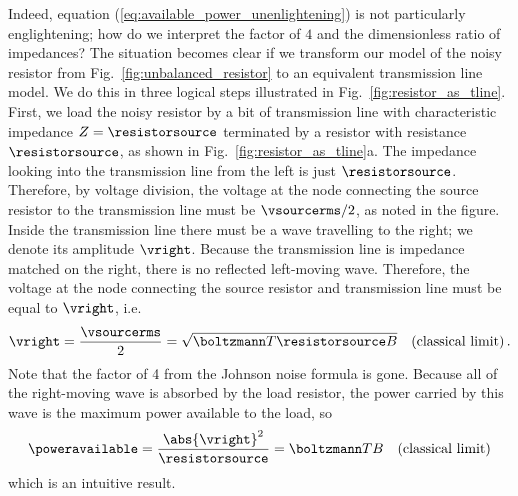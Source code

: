 Indeed, equation (\ref{eq:available_power_unenlightening}) is not particularly englightening; how do we interpret the factor of $4$ and the dimensionless ratio of impedances?
The situation becomes clear if we transform our model of the noisy resistor from Fig.~\ref{fig:unbalanced_resistor} to an equivalent transmission line model.
We do this in three logical steps illustrated in Fig.~\ref{fig:resistor_as_tline}.
First, we load the noisy resistor by a bit of transmission line with characteristic impedance $Z=\resistorsource$ terminated by a resistor with resistance $\resistorsource$, as shown in Fig.~\ref{fig:resistor_as_tline}a.
The impedance looking into the transmission line from the left is just $\resistorsource$.
Therefore, by voltage division, the voltage at the node connecting the source resistor to the transmission line must be $\vsourcerms/2$, as noted in the figure.
Inside the transmission line there must be a wave travelling to the right; we denote its amplitude $\vright$.
Because the transmission line is impedance matched on the right, there is no reflected left-moving wave.
Therefore, the voltage at the node connecting the source resistor and transmission line must be equal to $\vright$, i.e.
\begin{equation}
    \vright = \frac{\vsourcerms}{2} = \sqrt{\boltzmann T \resistorsource B} \quad \text{(classical limit)}
    \, .
\end{equation}
Note that the factor of 4 from the Johnson noise formula is gone.
Because all of the right-moving wave is absorbed by the load resistor, the power carried by this wave is the maximum power available to the load, so
\begin{equation}
    \poweravailable = \frac{\abs{\vright}^2}{\resistorsource} = \boltzmann T B \quad \text{(classical limit)}
\end{equation}
which is an intuitive result.

